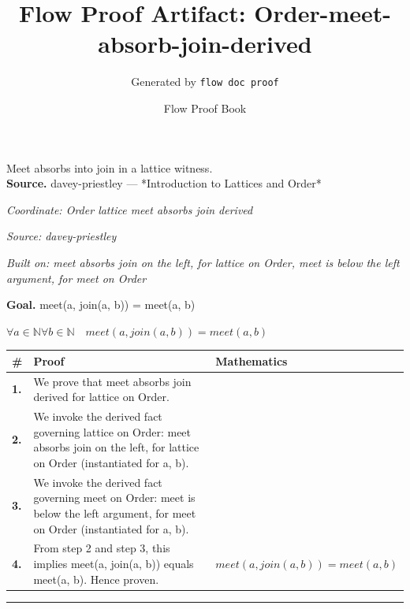 \documentclass[11pt]{article}
\title{Flow Proof Artifact: Order-meet-absorb-join-derived}
\author{Generated by \texttt{flow doc proof}}
\date{Flow Proof Book}
\theoremstyle{definition}
\begin{document}
\maketitle
Meet absorbs into join in a lattice witness.\\[0.5em]
\textbf{Source.} davey-priestley — *Introduction to Lattices and Order*\\[0.5em]
\bigskip
{}\par
\smallskip\noindent\textit{Coordinate: Order \cdot lattice \cdot meet absorbs join derived}\par
\smallskip\noindent\textit{Source: davey-priestley}\par
\smallskip\noindent\textit{Built on: meet absorbs join on the left, for lattice on Order, meet is below the left argument, for meet on Order}\par
\medskip
\noindent\textbf{Goal.} meet(a, join(a, b)) = meet(a, b)\par
\noindent$\displaystyle \forall a \in \mathbb{N} \forall b \in \mathbb{N}\quad meet(a, join(a, b)) = meet(a, b)$\par
\medskip
\noindent
\begin{tabular}{@{} >{\raggedright\arraybackslash}p{} >{\raggedright\arraybackslash}p{} >{\raggedleft\arraybackslash}p{} @{}}
\textbf{\#} & \textbf{Proof} & \textbf{Mathematics} \\
\midrule
\textbf{1.} & We prove that meet absorbs join derived for lattice on Order. & \\[0.45em]
\textbf{2.} & We invoke the derived fact governing lattice on Order: meet absorbs join on the left, for lattice on Order (instantiated for a, b). & \\[0.45em]
\textbf{3.} & We invoke the derived fact governing meet on Order: meet is below the left argument, for meet on Order (instantiated for a, b). & \\[0.45em]
\textbf{4.} & From step 2 and step 3, this implies meet(a, join(a, b)) equals meet(a, b). Hence proven. & $\displaystyle meet(a, join(a, b)) = meet(a, b)$ \\[0.45em]
\bottomrule
\end{tabular}
\label{thm:Order-lattice-meet_absorbs_join_derived}
\par\medskip\hrule
\end{document}
